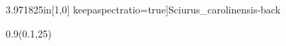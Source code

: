 \begin{textblock*}{3.971825in}[1,0]
                   keepaspectratio=true]{Sciurus_carolinensis-back}
\end{textblock*}

\begin{textblock*}{0.9\TPHorizModule}(0.1\TPHorizModule,25\TPVertModule)
\end{textblock*}

\endgroup

